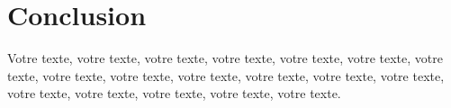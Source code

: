 \chapter*{Conclusion}


Votre texte, votre texte, votre texte, votre texte, votre texte, votre texte, votre texte, votre texte, votre texte, votre texte, votre texte, votre texte, votre texte, votre texte, votre texte, votre texte, votre texte, votre texte.